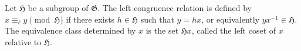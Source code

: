 Let $\mathfrak{H}$ be a subgroup of $\mathfrak{G}$. The left congruence relation is defined by $x \equiv_{\ell} y \pmod{\mathfrak{H}}$ if there exists $h \in \mathfrak{H}$ such that $y = hx$, or equivalently $yx^{-1} \in \mathfrak{H}$. The equivalence class determined by $x$ is the set $\mathfrak{H}x$, called the left coset of $x$ relative to $\mathfrak{H}$.
